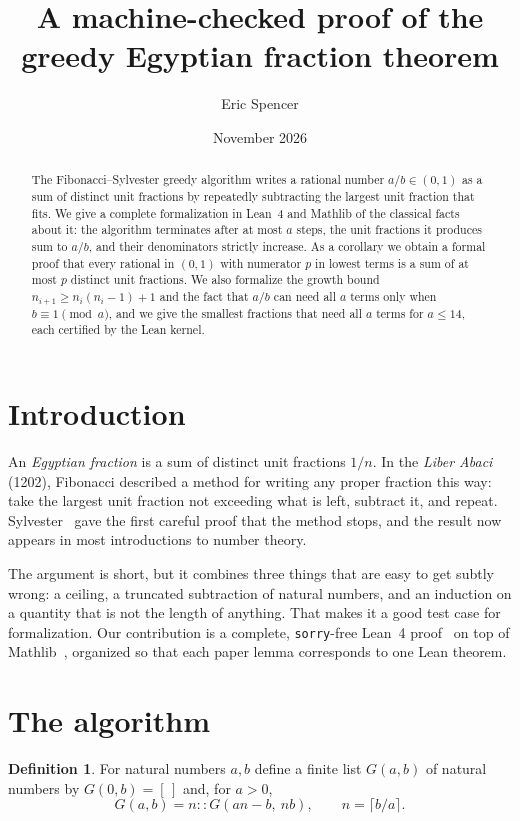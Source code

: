 \documentclass[11pt]{article}
\title{A machine-checked proof of the greedy Egyptian fraction theorem}
\author{Eric Spencer}
\date{November 2026}
\theoremstyle{definition}
\newtheorem{definition}[theorem]{Definition}
\theoremstyle{remark}
\begin{document}
\maketitle

\begin{abstract}
The Fibonacci--Sylvester greedy algorithm writes a rational number $a/b \in (0,1)$ as a sum of
distinct unit fractions by repeatedly subtracting the largest unit fraction that fits. We give a
complete formalization in Lean~4 and Mathlib of the classical facts about it: the algorithm
terminates after at most $a$ steps, the unit fractions it produces sum to $a/b$, and their
denominators strictly increase. As a corollary we obtain a formal proof that every rational in
$(0,1)$ with numerator $p$ in lowest terms is a sum of at most $p$ distinct unit fractions. We
also formalize the growth bound $n_{i+1} \ge n_i(n_i-1)+1$ and the fact that $a/b$ can need all
$a$ terms only when $b \equiv 1 \pmod a$, and we give the smallest fractions that need all $a$
terms for $a \le 14$, each certified by the Lean kernel.
\end{abstract}

\section{Introduction}

An \emph{Egyptian fraction} is a sum of distinct unit fractions $1/n$. In the
\emph{Liber Abaci} (1202), Fibonacci described a method for writing any proper fraction this
way: take the largest unit fraction not exceeding what is left, subtract it, and repeat.
Sylvester~\cite{sylvester} gave the first careful proof that the method stops, and the result now
appears in most introductions to number theory.

The argument is short, but it combines three things that are easy to get subtly wrong: a
ceiling, a truncated subtraction of natural numbers, and an induction on a quantity that is not
the length of anything. That makes it a good test case for formalization. Our contribution is a
complete, \texttt{sorry}-free Lean~4 proof~\cite{repo} on top of Mathlib~\cite{mathlib},
organized so that each paper lemma corresponds to one Lean theorem.

\section{The algorithm}

\begin{definition}
For natural numbers $a, b$ define a finite list $G(a,b)$ of natural numbers by $G(0,b) = [\,]$ and,
for $a > 0$,
\[
  G(a,b) = n :: G(an - b,\ nb), \qquad n = \lceil b/a \rceil .
\]
\end{definition}
\end{document}
